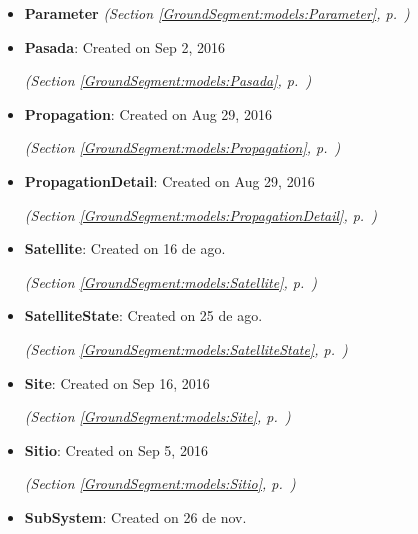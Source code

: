 \begin{itemize}
\begin{itemize}
  \end{itemize}
\item \textbf{Parameter}
  \textit{(Section \ref{GroundSegment:models:Parameter}, p.~\pageref{GroundSegment:models:Parameter})}

\item \textbf{Pasada}: Created on Sep 2, 2016



  \textit{(Section \ref{GroundSegment:models:Pasada}, p.~\pageref{GroundSegment:models:Pasada})}

\item \textbf{Propagation}: Created on Aug 29, 2016



  \textit{(Section \ref{GroundSegment:models:Propagation}, p.~\pageref{GroundSegment:models:Propagation})}

\item \textbf{PropagationDetail}: Created on Aug 29, 2016



  \textit{(Section \ref{GroundSegment:models:PropagationDetail}, p.~\pageref{GroundSegment:models:PropagationDetail})}

\item \textbf{Satellite}: Created on 16 de ago.



  \textit{(Section \ref{GroundSegment:models:Satellite}, p.~\pageref{GroundSegment:models:Satellite})}

\item \textbf{SatelliteState}: Created on 25 de ago.



  \textit{(Section \ref{GroundSegment:models:SatelliteState}, p.~\pageref{GroundSegment:models:SatelliteState})}

\item \textbf{Site}: Created on Sep 16, 2016



  \textit{(Section \ref{GroundSegment:models:Site}, p.~\pageref{GroundSegment:models:Site})}

\item \textbf{Sitio}: Created on Sep 5, 2016



  \textit{(Section \ref{GroundSegment:models:Sitio}, p.~\pageref{GroundSegment:models:Sitio})}

\item \textbf{SubSystem}: Created on 26 de nov.




\end{itemize}
